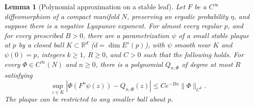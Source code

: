 \documentclass[12pt]{article}
\newtheorem{lemma}[theorem]{Lemma}
\theoremstyle{remark}
\newcommand{\R}{\mathbb R}
\begin{document}
\begin{lemma}[Polynomial approximation on a stable leaf]
\label{lem:polynomial}
Let \(F\) be a \(C^\infty\) diffeomorphism of a compact manifold \(N\),
preserving an ergodic probability \(\eta\), and suppose there is a
negative Lyapunov exponent.
For almost every regular \(p\), and for every prescribed \(B>0\),
there are a parametrization \(\psi\) of a small stable plaque at \(p\)
by a closed ball \(K\subset\R^d\) (\(d=\dim E^s(p)\)), with \(\psi\)
smooth near \(K\) and \(\psi(0)=p\),
integers \(k\ge1\), \(R\ge0\), and \(C>0\)
such that the following holds.
For every \(\Phi\in C^\infty(N)\) and \(n\ge0\), there is a polynomial
\(Q_{n,\Phi}\) of degree at most \(R\) satisfying
\begin{equation}\label{eq:poly-approx}
 \sup_{z\in K}
 \left|\Phi(F^n\psi(z))-Q_{n,\Phi}(z)\right|
       \le C e^{-Bn}\|\Phi\|_{C^k}.
\end{equation}
The plaque can be restricted to any smaller ball about \(p\).
\end{lemma}
\end{document}
